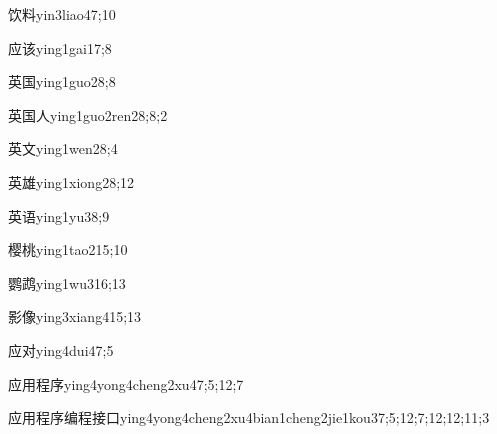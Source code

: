 \begin{verbete}{饮料}{yin3liao4}{7;10}
\end{verbete}

\begin{verbete}{应该}{ying1gai1}{7;8}
\end{verbete}

\begin{verbete}{英国}{ying1guo2}{8;8}
\end{verbete}

\begin{verbete}{英国人}{ying1guo2ren2}{8;8;2}
\end{verbete}

\begin{verbete}{英文}{ying1wen2}{8;4}
\end{verbete}

\begin{verbete}{英雄}{ying1xiong2}{8;12}
\end{verbete}

\begin{verbete}{英语}{ying1yu3}{8;9}
\end{verbete}

\begin{verbete}{樱桃}{ying1tao2}{15;10}
\end{verbete}

\begin{verbete}{鹦鹉}{ying1wu3}{16;13}
\end{verbete}

\begin{verbete}{影像}{ying3xiang4}{15;13}
\end{verbete}

\begin{verbete}{应对}{ying4dui4}{7;5}
\end{verbete}

\begin{verbete}{应用程序}{ying4yong4cheng2xu4}{7;5;12;7}
\end{verbete}

\begin{verbete}{应用程序编程接口}{ying4yong4cheng2xu4bian1cheng2jie1kou3}{7;5;12;7;12;12;11;3}
\end{verbete}

